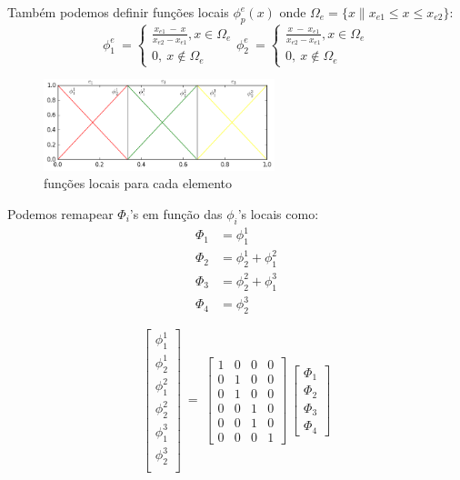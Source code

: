 Também podemos definir funções locais $\phi^e_p(x)$ onde $\Omega_e = \{x \| x_{e1} \leq x \leq x_{e2} \}$:
\begin{equation}
\phi^e_1\ = \left\{\begin{matrix}
\frac{x_{e1}\ -\ x}{x_{e2} - x_{e1}}, x \in \Omega_e \\
0 ,\ x \notin \Omega_e 
\end{matrix}\right.
\phi^e_2\ = \left\{\begin{matrix}
\frac{x\ -\ x_{e1}}{x_{e2} - x_{e1}}, x \in \Omega_e \\
0 ,\ x \notin \Omega_e 
\end{matrix}\right.
\end{equation} 

\begin{figure}[!h]
\includegraphics[width=0.6\textwidth, center ]{figuras/Matrix_element_local.png}
\caption{funções locais para cada elemento}
\end{figure}
 Podemos remapear $\Phi_i$'s em função das $\phi_i$'s locais como:
\begin{align}
\Phi_1 &= \phi_{1}^{1} \\[0.5pt]
\Phi_2 &= \phi_{2}^{1} + \phi_{1}^{2} \\[0.5pt]
\Phi_3 &= \phi_{2}^{2} + \phi_{1}^{3} \\[0.5pt]
\Phi_4 &= \phi_{2}^{3}
\end{align}

\begin{equation}
\begin{bmatrix}
\phi_1^1\\[1.9pt] 
\phi_2^1\\[1.9pt]
\phi_1^2\\[1.9pt] 
\phi_2^2\\[1.9pt]
\phi_1^3\\[1.9pt] 
\phi_2^3\\[1.9pt] 
\end{bmatrix}\ = \
\begin{bmatrix}
1 &0  & 0 & 0 \\ 
0 & 1 & 0 & 0\\ 
0 & 1 & 0 & 0\\ 
0 &0  & 1 & 0\\ 
0 &0  & 1 & 0\\ 
0 &0  & 0 & 1
\end{bmatrix}\
\begin{bmatrix}
\Phi_1\\ 
\Phi_2\\ 
\Phi_3\\ 
\Phi_4
\end{bmatrix}
\end{equation}

